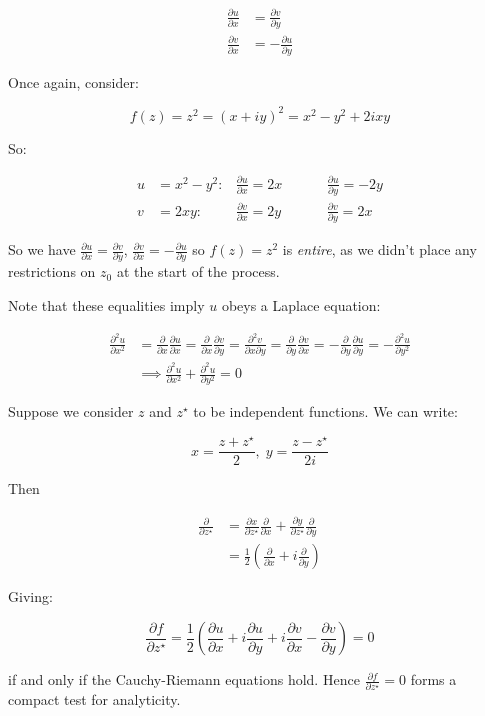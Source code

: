 \documentclass{../../physics_notes}
\begin{document}
\begin{align*}
\frac{\partial u}{\partial x} &= \frac{\partial v}{\partial y} \\
\frac{\partial v}{\partial x} &= -\frac{\partial u}{\partial y}
\end{align*}

Once again, consider: 

\[ f(z) = z^2 = (x + iy)^2 = x^2 - y^2 + 2ixy \]

So:

\begin{align*}
u &= x^2 - y^2 :  & \frac{\partial u}{\partial x} = 2x \hspace{1cm} & \frac{\partial u}{\partial y} = -2y \\
v &= 2xy : & \frac{\partial v}{\partial x} = 2y \hspace{1cm} & \frac{\partial v}{\partial y} = 2x 
\end{align*}

So we have $\frac{\partial u}{\partial x} = \frac{\partial v}{\partial y}$, $\frac{\partial v}{\partial x} = -\frac{\partial u}{\partial y}$ so $f(z) = z^2$ is \emph{entire}, as we didn't place any restrictions on $z_0$ at the start of the process. 

Note that these equalities imply $u$ obeys a Laplace equation:

\begin{align*}
\frac{\partial^2 u}{\partial x^2} &= \frac{\partial}{\partial x}\frac{\partial u}{\partial x} = \frac{\partial}{\partial x} \frac{\partial v}{\partial y} = \frac{\partial^2 v}{\partial x \partial y} = \frac{\partial}{\partial y}\frac{\partial v}{\partial x} = -\frac{\partial}{\partial y}\frac{\partial u}{\partial y} = -\frac{\partial^2 u}{\partial y^2} \\
&\implies \frac{\partial^2 u}{\partial x^2} + \frac{\partial^2 u}{\partial y^2} = 0
\end{align*}

Suppose we consider $z$ and $z^\star$ to be independent functions. We can write:

\[ x = \frac{z + z^\star}{2}, \; y = \frac{z - z^\star}{2i} \]

Then 

\begin{align*} 
\frac{\partial}{\partial z^\star} &= \frac{\partial x}{\partial z^\star}\frac{\partial}{\partial x} + \frac{\partial y}{\partial z^\star}\frac{\partial}{\partial y}\\
&= \frac{1}{2}\left(\frac{\partial}{\partial x} + i\frac{\partial}{\partial y} \right)
\end{align*}

Giving:

\[ \frac{\partial f}{\partial z^\star} = \frac{1}{2}\left(\frac{\partial u}{\partial x} + i\frac{\partial u}{\partial y} + i\frac{\partial v}{\partial x} - \frac{\partial v}{\partial y}\right) = 0 \]

if and only if the Cauchy-Riemann equations hold. Hence $\frac{\partial f}{\partial z^\star} = 0$ forms a compact test for analyticity. 
\end{document}
